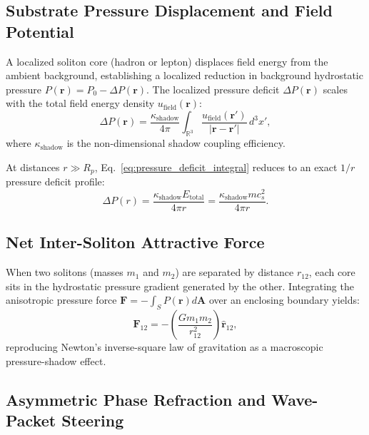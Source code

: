\documentclass[11pt,a4paper]{article}
\begin{document}
	\subsection{Substrate Pressure Displacement and Field Potential}
	A localized soliton core (hadron or lepton) displaces field energy from the ambient background, establishing a localized reduction in background hydrostatic pressure $P(\mathbf{r}) = P_0 - \Delta P(\mathbf{r})$. The localized pressure deficit $\Delta P(\mathbf{r})$ scales with the total field energy density $u_{\text{field}}(\mathbf{r})$:
	\begin{equation}
		\Delta P(\mathbf{r}) = \frac{\kappa_{\text{shadow}}}{4\pi} \int_{\mathbb{R}^3} \frac{u_{\text{field}}(\mathbf{r}')}{|\mathbf{r} - \mathbf{r}'|} \, d^3x',
		\label{eq:pressure_deficit_integral}
	\end{equation}
	where $\kappa_{\text{shadow}}$ is the non-dimensional shadow coupling efficiency.
	
	At distances $r \gg R_p$, Eq.\ \eqref{eq:pressure_deficit_integral} reduces to an exact $1/r$ pressure deficit profile:
	\begin{equation}
		\Delta P(r) = \frac{\kappa_{\text{shadow}} E_{\text{total}}}{4\pi r} = \frac{\kappa_{\text{shadow}} m c_s^2}{4\pi r}.
		\label{eq:asymptotic_pressure_deficit}
	\end{equation}
	
	\subsection{Net Inter-Soliton Attractive Force}
	When two solitons (masses $m_1$ and $m_2$) are separated by distance $r_{12}$, each core sits in the hydrostatic pressure gradient generated by the other. Integrating the anisotropic pressure force $\mathbf{F} = -\int_S P(\mathbf{r}) d\mathbf{A}$ over an enclosing boundary yields:
	\begin{equation}
		\mathbf{F}_{12} = -\left( \frac{G m_1 m_2}{r_{12}^2} \right) \hat{\mathbf{r}}_{12},
		\label{eq:newton_law_derived}
	\end{equation}
	reproducing Newton's inverse-square law of gravitation as a macroscopic pressure-shadow effect.
	
	\subsection{Asymmetric Phase Refraction and Wave-Packet Steering}
	\label{sec:phase_refraction}
	
\end{document}
